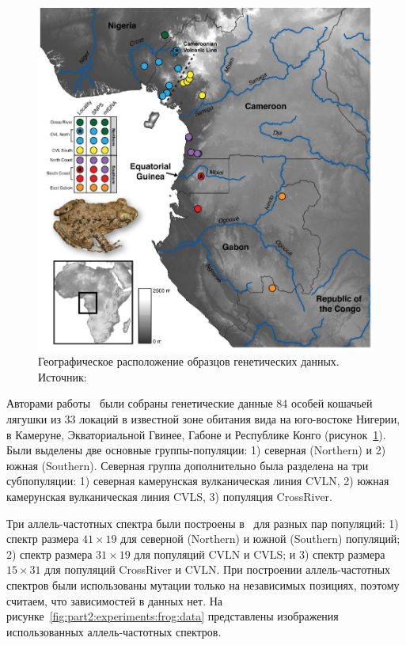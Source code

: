 \begin{figure}[b]
    \centering
        \includegraphics[width=0.45\linewidth]{images_experiments/gaboon_forest_frog/from_paper.pdf}
    \caption{Географическое расположение образцов генетических данных. Источник: \cite{portik2017evaluating}}
    \label{fig:part2:experiments:frog:geogr}
\end{figure}

Авторами работы~\cite{portik2017evaluating} были собраны генетические данные 84 особей кошачьей лягушки из 33 локаций в известной зоне обитания вида на юго-востоке Нигерии, в Камеруне, Экваториальной Гвинее, Габоне и Республике Конго (рисунок~\ref{fig:part2:experiments:frog:geogr}).
Были выделены две основные группы-популяции: 1) северная (Northern) и 2) южная (Southern).
Северная группа дополнительно была разделена на три субпопуляции: 1) северная камерунская вулканическая линия CVLN, 2) южная камерунская вулканическая линия CVLS, 3) популяция CrossRiver.

Три аллель-частотных спектра были построены в~\cite{portik2017evaluating} для разных пар популяций: 1) спектр размера $41\times 19$ для северной (Northern) и южной (Southern) популяций; 2) спектр размера $31\times 19$ для популяций CVLN и CVLS; и 3) спектр размера $15 \times 31$ для популяций CrossRiver и CVLN.
При построении аллель-частотных спектров были использованы мутации только на независимых позициях, поэтому считаем, что зависимостей в данных нет.
На рисунке~\ref{fig:part2:experiments:frog:data} представлены изображения использованных аллель-частотных спектров.

